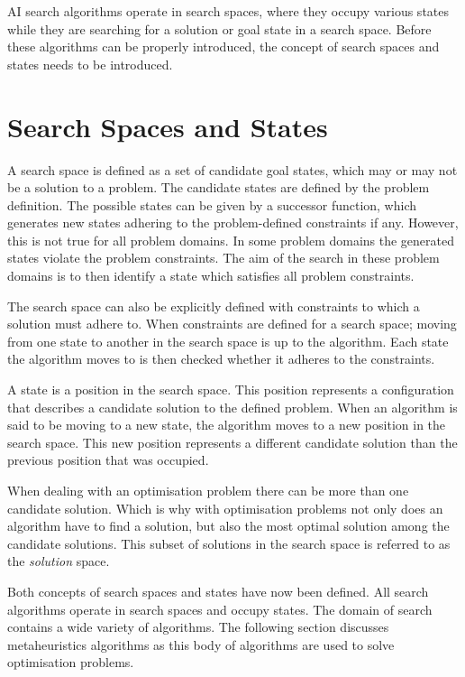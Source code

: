 \gls{AI} search algorithms operate in search spaces, where they occupy various states while they are searching for a solution or goal state in a search space. Before these algorithms can be properly introduced, the concept of search spaces and states needs to be introduced.

\section{Search Spaces and States}
A search space is defined as a set of candidate goal states, which may or may not be a solution to a problem\cite{AIModernApproach}. The candidate states are defined by the problem definition\cite{AIModernApproach}. The possible states can be given by a successor function, which generates new states adhering to the problem-defined constraints if any\cite{AIModernApproach}. However, this is not true for all problem domains. In some problem domains the generated states violate the problem constraints. The aim of the search in these problem domains is to then identify a state which satisfies all problem constraints.

The search space can also be explicitly defined with constraints to which a solution must adhere to\cite{AIModernApproach}. When constraints are defined for a search space; moving from one state to another in the search space is up to the algorithm\cite{AIModernApproach}. Each state the algorithm moves to is then checked whether it adheres to the constraints\cite{AIModernApproach}.

A state is a position in the search space\cite{AIModernApproach}. This position represents a configuration that describes a candidate solution to the defined problem\cite{AIModernApproach}. When an algorithm is said to be moving to a new state, the algorithm moves to a new position in the search space\cite{AIModernApproach}. This new position represents a different candidate solution than the previous position that was occupied\cite{AIModernApproach}.

When dealing with an optimisation problem there can be more than one candidate solution\cite{AIModernApproach}. Which is why with optimisation problems not only does an algorithm have to find a solution, but also the most optimal solution among the candidate solutions\cite{AIModernApproach}. This subset of solutions in the search space is referred to as the \emph{solution} space.

Both concepts of search spaces and states have now been defined. All search algorithms operate in search spaces and occupy states. The domain of search contains a wide variety of algorithms. The following section discusses metaheuristics algorithms as this body of algorithms are used to solve optimisation problems.

